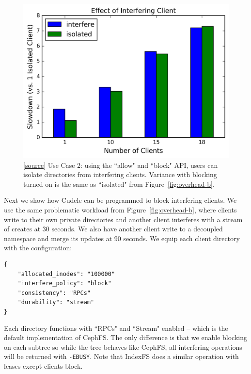 \begin{figure}[tb]
\centering
\includegraphics[width=1.0\linewidth]{graphs/block-allow.png}
\caption{ [\href{https://...}{source}] Use Case 2: using the ``allow" and
``block" API, users can isolate directories from interfering clients. Variance
with blocking turned on is the same as ``isolated" from
Figure~\ref{fig:overhead-b}.
\label{fig:slowdown-allow-block}}

\end{figure}

Next we show how Cudele can be programmed to block interfering clients. We
use the same problematic workload from Figure~\ref{fig:overhead-b}, where
clients write to their own private directories and another client interferes with a stream of creates at
30 seconds.  We also have another client write to a decoupled namespace and
merge its updates at 90 seconds.  We equip each client directory with the
configuration:

\begin{listing}[tb]
\begin{verbatim}
{     
    "allocated_inodes": "100000"
    "interfere_policy": "block"
    "consistency": "RPCs"
    "durability": "stream"
}
\end{verbatim}
\end{listing}

Each directory functions with ``RPCs"
and ``Stream" enabled -- which is the default implementation of CephFS. The only
difference is that we enable blocking on each subtree so while the tree behaves
like CephFS, all interfering operations will be returned with \texttt{-EBUSY}.
Note that IndexFS does a similar operation with leases except clients block.

